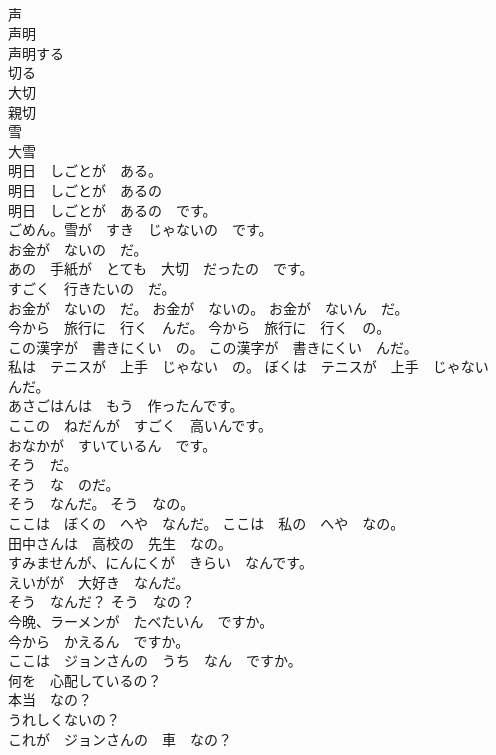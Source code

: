 \documentclass[8pt]{extreport}
\begin{document}
\begin{CJK}{UTF8}{min}
\\	声	
\\	声明	
\\	声明する	
\\	切る	
\\	大切	
\\	親切	
\\	雪	
\\	大雪	
\\	明日　しごとが　ある。	
\\	明日　しごとが　あるの	
\\	明日　しごとが　あるの　です。	
\\	ごめん。雪が　すき　じゃないの　です。	
\\	お金が　ないの　だ。	
\\	あの　手紙が　とても　大切　だったの　です。	
\\	すごく　行きたいの　だ。	
\\	お金が　ないの　だ。 お金が　ないの。 お金が　ないん　だ。	
\\	今から　旅行に　行く　んだ。 今から　旅行に　行く　の。	
\\	この漢字が　書きにくい　の。 この漢字が　書きにくい　んだ。	
\\	私は　テニスが　上手　じゃない　の。 ぼくは　テニスが　上手　じゃない　んだ。	
\\	あさごはんは　もう　作ったんです。	
\\	ここの　ねだんが　すごく　高いんです。	
\\	おなかが　すいているん　です。	
\\	そう　だ。	
\\	そう　な　のだ。	
\\	そう　なんだ。 そう　なの。	
\\	ここは　ぼくの　へや　なんだ。 ここは　私の　へや　なの。	
\\	田中さんは　高校の　先生　なの。	
\\	すみませんが、にんにくが　きらい　なんです。	
\\	えいがが　大好き　なんだ。	
\\	そう　なんだ？ そう　なの？	
\\	今晩、ラーメンが　たべたいん　ですか。	
\\	今から　かえるん　ですか。	
\\	ここは　ジョンさんの　うち　なん　ですか。	
\\	何を　心配しているの？	
\\	本当　なの？	
\\	うれしくないの？	
\\	これが　ジョンさんの　車　なの？	

\end{CJK}
\end{document}
